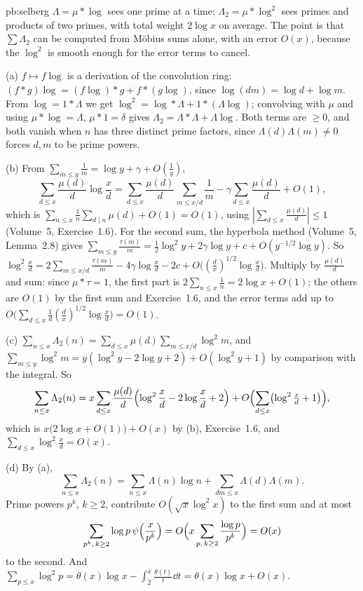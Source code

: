 \begin{solution}{pb:selberg}
\idea $\Lambda=\mu*\log$ sees one prime at a time; $\Lambda_2=\mu*\log^2$ sees primes and products of two primes, with total weight $2\log x$ on average. The point is that
$\sum\Lambda_2$ can be computed from Möbius sums alone, with an error $O(x)$, because the $\log^2$ is smooth enough for the error terms to cancel.

\writeup (a) $f\mapsto f\log$ is a derivation of the convolution ring: $(f*g)\log=(f\log)*g+f*(g\log)$, since $\log(dm)=\log d+\log m$. From $\log=1*\Lambda$ we get
$\log^2=\log*\Lambda+1*(\Lambda\log)$; convolving with $\mu$ and using $\mu*\log=\Lambda$, $\mu*1=\delta$ gives $\Lambda_2=\Lambda*\Lambda+\Lambda\log$. Both terms are $\ge0$, and both vanish when
$n$ has three distinct prime factors, since $\Lambda(d)\Lambda(m)\ne0$ forces $d,m$ to be prime powers.

(b) From $\sum_{m\le y}\frac1m=\log y+\gamma+O(\frac1y)$,
\[
\sum_{d\le x}\frac{\mu(d)}d\log\frac xd=\sum_{d\le x}\frac{\mu(d)}d\sum_{m\le x/d}\frac1m-\gamma\sum_{d\le x}\frac{\mu(d)}d+O(1),
\]
which is $\sum_{n\le x}\frac1n\sum_{d\mid n}\mu(d)+O(1)=O(1)$, using
$|\sum_{d\le x}\frac{\mu(d)}d|\le1$ (Volume~5, Exercise~1.6). For the second sum, the hyperbola method (Volume~5, Lemma~2.8) gives
$\sum_{m\le y}\frac{\tau(m)}m=\frac12\log^2y+2\gamma\log y+c+O(y^{-1/2}\log y)$. So $\log^2\frac xd=2\sum_{m\le x/d}\frac{\tau(m)}m-4\gamma\log\frac xd-2c+O\bigl((\frac dx)^{1/2}\log\frac xd\bigr)$. Multiply
by $\frac{\mu(d)}d$ and sum: since $\mu*\tau=1$, the first part is $2\sum_{n\le x}\frac1n=2\log x+O(1)$; the others are $O(1)$ by the first sum and Exercise~1.6, and the error
terms add up to $O\bigl(\sum_{d\le x}\frac1d(\frac dx)^{1/2}\log\frac xd\bigr)=O(1)$.

(c) $\sum_{n\le x}\Lambda_2(n)=\sum_{d\le x}\mu(d)\sum_{m\le x/d}\log^2m$, and $\sum_{m\le y}\log^2m=y(\log^2y-2\log y+2)+O(\log^2y+1)$ by comparison with the integral. So
\[
\sum_{n\le x}\Lambda_2(n)=x\sum_{d\le x}\frac{\mu(d)}d\Bigl(\log^2\frac xd-2\log\frac xd+2\Bigr)+O\Bigl(\sum_{d\le x}\bigl(\log^2\tfrac xd+1\bigr)\Bigr),
\]
which is $x\bigl(2\log x+O(1)\bigr)+O(x)$ by (b), Exercise~1.6, and $\sum_{d\le x}\log^2\frac xd=O(x)$.

(d) By (a),
\[
\sum_{n\le x}\Lambda_2(n)=\sum_{n\le x}\Lambda(n)\log n+\sum_{dm\le x}\Lambda(d)\Lambda(m).
\]
Prime powers $p^k$, $k\ge2$, contribute $O(\sqrt x\log^2x)$ to the first sum and at most
\[
\sum_{p^k,\,k\ge2}\log p\,\psi\Bigl(\frac x{p^k}\Bigr)=O\Bigl(x\sum_{p,\,k\ge2}\frac{\log p}{p^k}\Bigr)=O(x)
\]
to the second. And $\sum_{p\le x}\log^2p=\theta(x)\log x-\int_2^x\frac{\theta(t)}t\dd t=\theta(x)\log x+O(x)$.


\end{solution}
